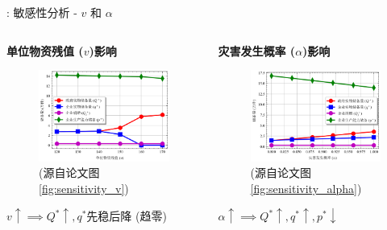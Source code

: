 \documentclass[9pt]{beamer}
\begin{document}
\begin{frame}{\insertsectionhead: 敏感性分析 - $v$ 和 $\alpha$}
    \begin{columns}[T]
        \begin{column}{0.5\textwidth}
            \textbf{单位物资残值 ($v$)影响}
            \begin{figure}
                \includegraphics[width=\linewidth]{basic_pictures/sensitivity_v.png}
                \caption*{(源自论文图 \ref{fig:sensitivity_v})}
            \end{figure}
            \footnotesize $v \uparrow \implies Q^* \uparrow, q^*$先稳后降 (趋零)
        \end{column}
        \begin{column}{0.5\textwidth}
            \textbf{灾害发生概率 ($\alpha$)影响}
            \begin{figure}
                \includegraphics[width=\linewidth]{basic_pictures/sensitivity_alpha.png}
                \caption*{(源自论文图 \ref{fig:sensitivity_alpha})}
            \end{figure}
            \footnotesize $\alpha \uparrow \implies Q^* \uparrow, q^* \uparrow, p^* \downarrow$
        \end{column}
    \end{columns}
\end{frame}
\end{document}
